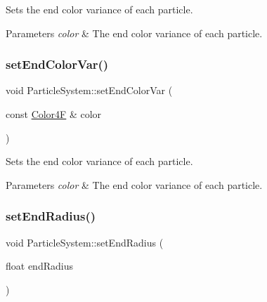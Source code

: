 Sets the end color variance of each particle.


\begin{DoxyParams}{Parameters}
{\em color} & The end color variance of each particle. \\
\hline
\end{DoxyParams}
\mbox{\label{classParticleSystem_a97c0354219c2fdc0451a99ce25484b3d}} 
\subsubsection{\texorpdfstring{set\+End\+Color\+Var()}{setEndColorVar()}\hspace{0.1cm}{\footnotesize\ttfamily [2/2]}}
{\footnotesize\ttfamily void Particle\+System\+::set\+End\+Color\+Var (\begin{DoxyParamCaption}\item[{const \hyperlink{structColor4F}{Color4F} \&}]{color }\end{DoxyParamCaption})\hspace{0.3cm}{\ttfamily [inline]}}

Sets the end color variance of each particle.


\begin{DoxyParams}{Parameters}
{\em color} & The end color variance of each particle. \\
\hline
\end{DoxyParams}
\mbox{\label{classParticleSystem_ad240a482288ba1272efd245d9fb8122a}} 
\subsubsection{\texorpdfstring{set\+End\+Radius()}{setEndRadius()}\hspace{0.1cm}{\footnotesize\ttfamily [1/2]}}
{\footnotesize\ttfamily void Particle\+System\+::set\+End\+Radius (\begin{DoxyParamCaption}\item[{float}]{end\+Radius }\end{DoxyParamCaption})\hspace{0.3cm}{\ttfamily [virtual]}}

